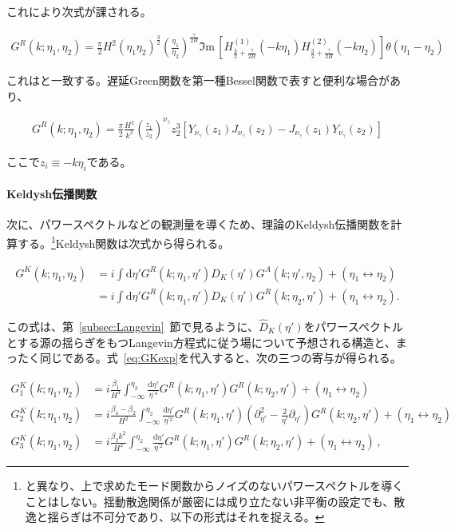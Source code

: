 \documentclass[a4paper,11pt]{ltjsarticle}
\numberwithin{equation}{section}
\newcommand{\dd}{\mathrm{d}}
\newcommand{\Ima}{\Im \mathrm{m}\,}
\newcommand{\Eq}[1]{Eq.~(\ref{#1})}
\newcommand{\Sec}[1]{Sec.~\ref{#1}}
\renewcommand{\Eq}[1]{式~\eqref{#1}}
\renewcommand{\Sec}[1]{第~\ref{#1}~節}
\begin{document}
これにより次式が課される。

\begin{align}\label{eq:GRfinsimp}
G^R(k; \eta_1,\eta_2) =  \frac{\pi}{2} H^2 (\eta_1 \eta_2)^{\frac{3}{2}}\left(\frac{\eta_1}{\eta_2} \right)^{\frac{\gamma}{2H}}  \Ima\left[H^{(1)}_{\frac{3}{2}+ \frac{\gamma}{2H}}(-k \eta_1) H^{(2)}_{\frac{3}{2}+ \frac{\gamma}{2H}}(-k\eta_2)   \right] \theta(\eta_1-\eta_2) 
\end{align}

これは\cite{LopezNacir:2011kk,Creminelli:2023aly}と一致する。遅延Green関数を第一種Bessel関数で表すと便利な場合があり、

\begin{align}\label{eq:GRfinsimpv2}
G^R(k;\eta_1,\eta_2) = \frac{\pi}{2} \frac{H^2}{k^3} \left(\frac{z_1}{z_2}\right)^{\nu_\gamma} z_2^{3}\left[Y_{\nu_\gamma}(z_1)J_{\nu_\gamma}(z_2) -J_{\nu_\gamma}(z_1)Y_{\nu_\gamma}(z_2) \right]
\end{align}

ここで$z_i\equiv-k\eta_i$である。

\paragraph{Keldysh伝播関数} 次に、パワースペクトルなどの観測量を導くため、理論のKeldysh伝播関数を計算する。\footnote{\cite{LopezNacir:2011kk,Creminelli:2023aly}と異なり、上で求めたモード関数からノイズのないパワースペクトルを導くことはしない。揺動散逸関係が厳密には成り立たない非平衡の設定でも、散逸と揺らぎは不可分であり\cite{Calzetta:2008iqa,Kamenev:2009jj}、以下の形式はそれを捉える。}Keldysh関数は次式から得られる。

\begin{align}
     G^K(k; \eta_1,\eta_2) &= i\int \dd \eta' G^R(k; \eta_1,\eta') \widehat{D}_K(\eta' ) G^A(k; \eta',\eta_2) + (\eta_1 \leftrightarrow \eta_2) \\
     &= i \int \dd \eta' G^R(k; \eta_1,\eta') \widehat{D}_K(\eta' ) G^R(k; \eta_2,\eta') + (\eta_1 \leftrightarrow \eta_2).
\end{align}

この式は、\Sec{subsec:Langevin}で見るように、$\widehat D_K(\eta')$をパワースペクトルとする源の揺らぎをもつLangevin方程式に従う場について予想される構造と、まったく同じである。\Eq{eq:GKexp}を代入すると、次の三つの寄与が得られる。

\begin{align}
     G^K_1(k; \eta_1,\eta_2) &= i \frac{\beta_1}{H^4}\int_{-\infty}^{\eta_2} \frac{\dd \eta'}{\eta^{\prime4}} G^R(k; \eta_1,\eta') G^R(k; \eta_2,\eta') + (\eta_1 \leftrightarrow \eta_2) \label{eq:GK1}\\
     G^K_2(k; \eta_1,\eta_2) &= i \frac{\beta_4 - \beta_2}{H^2}\int_{-\infty}^{\eta_2} \frac{\dd \eta'}{\eta^{\prime2}} G^R(k; \eta_1,\eta')\left( \partial_{\eta'}^2 - \frac{2}{\eta'}\partial_{\eta'}\right) G^R(k; \eta_2,\eta') + (\eta_1 \leftrightarrow \eta_2) \label{eq:GK2} \\
     G^K_3(k; \eta_1,\eta_2) &= i \frac{\beta_2 k^2}{H^2}\int_{-\infty}^{\eta_2} \frac{\dd \eta'}{\eta^{\prime2}} G^R(k; \eta_1,\eta') G^R(k; \eta_2,\eta') + (\eta_1 \leftrightarrow \eta_2) \,,\label{eq:GK3}
\end{align}
\end{document}

